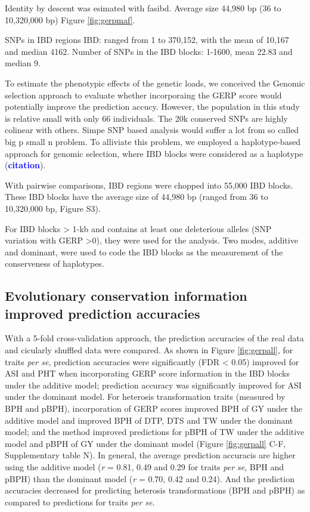 \documentclass[9pt,twocolumn,twoside]{gsajnl}
\newcommand{\yang}[1]{\textcolor{blue}{\bf #1}}
\begin{document}
Identity by descent was esimated with fasibd.
Average size 44,980 bp (36 to 10,320,000 bp)
Figure \ref{fig:gerpmaf}.

SNPs in IBD regions
IBD: ranged from 1 to 370,152, with the mean of 10,167 and median 4162.
Number of SNPs in the IBD blocks: 1-1600, mean 22.83 and median 9.



To estimate the phenotypic effects of the genetic loads, we conceived the Genomic selection approach to evaluate whether incorporaing the GERP score would potentially improve the prediction accucy. However, the population in this study is relative small with only 66 individuals. The 20k conserved SNPs are highly colinear with others. Simpe SNP based analysis would suffer a lot from so called big p small n problem. To alliviate this problem, we employed a haplotype-based approach for genomic selection, where IBD blocks were considered as a haplotype (\yang{citation}).

With pairwise comparisons, IBD regions were chopped into 55,000 IBD blocks. These IBD blocks have the average size of 44,980 bp (ranged from 36 to 10,320,000 bp, Figure S3). 

For IBD blocks > 1-kb and contains at least one deleterious alleles (SNP variation with GERP >0), they were used for the analysis. Two modes, additive and dominant, were used to code the IBD blocks as the measurement of the conserveness of haplotypes.  


\subsection*{Evolutionary conservation information improved prediction accuracies}


With a 5-fold cross-validation approach, the prediction accuracies of the real data and cicularly shuffled data were compared. 
As shown in Figure \ref{fig:gerpall}, for traits \emph{per se}, prediction accuracies were significantly (FDR < 0.05) improved for ASI and PHT when incorporating GERP score information in the IBD blocks under the additive model; prediction accuracy was significantly improved for ASI under the dominant model. For heterosis transformation traits (measured by BPH and pBPH), incorporation of GERP scores improved BPH of GY under the additive model and improved BPH of DTP, DTS and TW under the dominant model; and the method improved predictions for pBPH of TW under the additive model and pBPH of GY under the dominant model (Figure \ref{fig:gerpall} C-F, Supplementary table N). In general, the average prediction accuracis are higher using the additive model (\emph{r} = 0.81, 0.49 and 0.29 for traits \emph{per se}, BPH and pBPH) than the dominant model (\emph{r} = 0.70, 0.42 and 0.24). And the prediction accuracies decreased for predicting heterosis transformations (BPH and pBPH) as compared to predictions for traits \emph{per se}.
\end{document}
